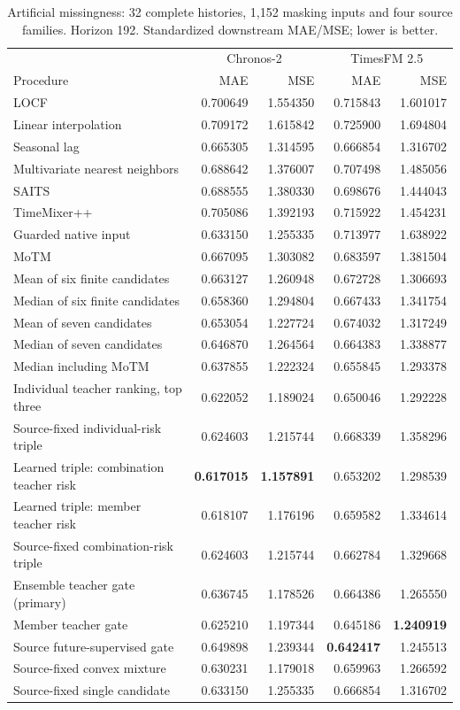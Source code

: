 \begin{table}[!htbp]
\caption{Artificial missingness: 32 complete histories, 1,152 masking inputs and four source families. Horizon 192. Standardized downstream MAE/MSE; lower is better.}
\label{tab:r6_all_synthetic_h192}
\centering\small
\begin{tabular}{lrrrr}
\toprule
 & \multicolumn{2}{c}{Chronos-2} & \multicolumn{2}{c}{TimesFM 2.5}\\
Procedure & MAE & MSE & MAE & MSE\\
\midrule
LOCF & 0.700649 & 1.554350 & 0.715843 & 1.601017\\
Linear interpolation & 0.709172 & 1.615842 & 0.725900 & 1.694804\\
Seasonal lag & 0.665305 & 1.314595 & 0.666854 & 1.316702\\
Multivariate nearest neighbors & 0.688642 & 1.376007 & 0.707498 & 1.485056\\
SAITS & 0.688555 & 1.380330 & 0.698676 & 1.444043\\
TimeMixer++ & 0.705086 & 1.392193 & 0.715922 & 1.454231\\
Guarded native input & 0.633150 & 1.255335 & 0.713977 & 1.638922\\
MoTM & 0.667095 & 1.303082 & 0.683597 & 1.381504\\
Mean of six finite candidates & 0.663127 & 1.260948 & 0.672728 & 1.306693\\
Median of six finite candidates & 0.658360 & 1.294804 & 0.667433 & 1.341754\\
Mean of seven candidates & 0.653054 & 1.227724 & 0.674032 & 1.317249\\
Median of seven candidates & 0.646870 & 1.264564 & 0.664383 & 1.338877\\
Median including MoTM & 0.637855 & 1.222324 & 0.655845 & 1.293378\\
Individual teacher ranking, top three & 0.622052 & 1.189024 & 0.650046 & 1.292228\\
Source-fixed individual-risk triple & 0.624603 & 1.215744 & 0.668339 & 1.358296\\
Learned triple: combination teacher risk & \textbf{0.617015} & \textbf{1.157891} & 0.653202 & 1.298539\\
Learned triple: member teacher risk & 0.618107 & 1.176196 & 0.659582 & 1.334614\\
Source-fixed combination-risk triple & 0.624603 & 1.215744 & 0.662784 & 1.329668\\
Ensemble teacher gate (primary) & 0.636745 & 1.178526 & 0.664386 & 1.265550\\
Member teacher gate & 0.625210 & 1.197344 & 0.645186 & \textbf{1.240919}\\
Source future-supervised gate & 0.649898 & 1.239344 & \textbf{0.642417} & 1.245513\\
Source-fixed convex mixture & 0.630231 & 1.179018 & 0.659963 & 1.266592\\
Source-fixed single candidate & 0.633150 & 1.255335 & 0.666854 & 1.316702\\
\bottomrule
\end{tabular}
\end{table}

